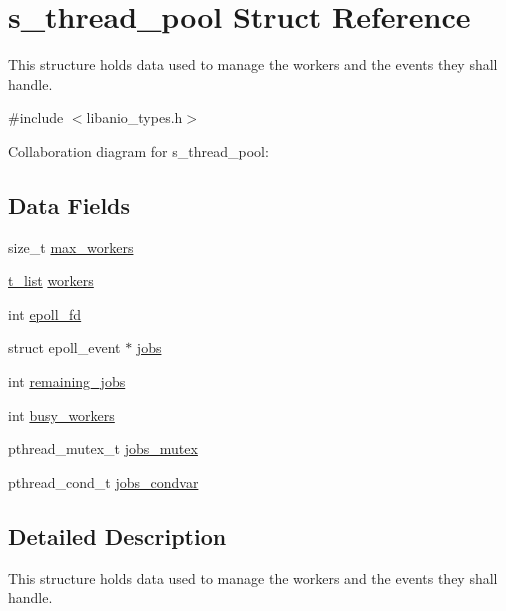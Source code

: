 \hypertarget{structs__thread__pool}{}\section{s\+\_\+thread\+\_\+pool Struct Reference}
\label{structs__thread__pool}


This structure holds data used to manage the workers and the events they shall handle.  




{\ttfamily \#include $<$libanio\+\_\+types.\+h$>$}



Collaboration diagram for s\+\_\+thread\+\_\+pool\+:
\subsection*{Data Fields}
\begin{DoxyCompactItemize}
\item 
size\+\_\+t \hyperlink{structs__thread__pool_a6514baa133ead32a26873fb71efb4fc3}{max\+\_\+workers}
\item 
\hyperlink{structs__list}{t\+\_\+list} \hyperlink{structs__thread__pool_a499f3b150499f33aacbeeeee14cdcdbf}{workers}
\item 
int \hyperlink{structs__thread__pool_ad29f26123236fdfa8e758cd4dd75ff0b}{epoll\+\_\+fd}
\item 
struct epoll\+\_\+event $\ast$ \hyperlink{structs__thread__pool_a88d77ee858e9c9d6b43bdcb35c86b73b}{jobs}
\item 
int \hyperlink{structs__thread__pool_a770306a3ae1ad4b1fbc15666e2070474}{remaining\+\_\+jobs}
\item 
int \hyperlink{structs__thread__pool_a93fd6e2cb28298435a38d19df6b8ceb0}{busy\+\_\+workers}
\item 
pthread\+\_\+mutex\+\_\+t \hyperlink{structs__thread__pool_a28c1be718ce196b7a79bbe7c815e90fe}{jobs\+\_\+mutex}
\item 
pthread\+\_\+cond\+\_\+t \hyperlink{structs__thread__pool_aef0ffc31f56dff666865314b3b7f14df}{jobs\+\_\+condvar}
\end{DoxyCompactItemize}


\subsection{Detailed Description}
This structure holds data used to manage the workers and the events they shall handle. 

